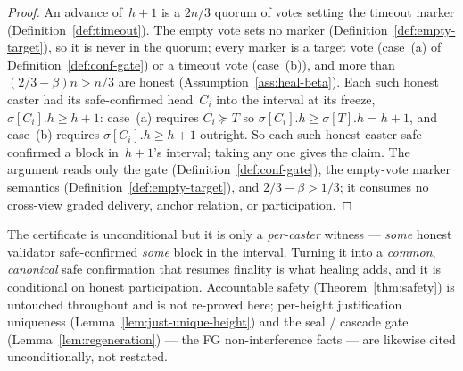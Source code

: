 \ifx\litemode\undefined\documentclass{article}\fi
\theoremstyle{plain}
\theoremstyle{definition}
\theoremstyle{remark}
\begin{document}
\begin{proof}
An advance of~\(h+1\) is a \(2n/3\) quorum of votes setting the timeout marker
(Definition~\ref{def:timeout}).  The empty vote sets no marker
(Definition~\ref{def:empty-target}), so it is never in the quorum; every marker is
a target vote (case~(a) of Definition~\ref{def:conf-gate}) or a timeout vote
(case~(b)), and more than \((2/3-\beta)n > n/3\) are honest
(Assumption~\ref{ass:heal-beta}).  Each such honest caster had its safe-confirmed
head~\(C_i\) into the interval at its freeze, \(\sigma[C_i].h \geq h+1\): case~(a)
requires \(C_i \succeq T\) so \(\sigma[C_i].h \geq \sigma[T].h = h+1\), and case~(b)
requires \(\sigma[C_i].h \geq h+1\) outright.  So each such honest caster
safe-confirmed a block in~\(h+1\)'s interval; taking any one gives the claim.  The
argument reads only the gate (Definition~\ref{def:conf-gate}), the empty-vote
marker semantics (Definition~\ref{def:empty-target}), and \(2/3-\beta>1/3\); it
consumes no cross-view graded delivery, anchor relation, or participation.
\end{proof}

The certificate is unconditional but it is only a \emph{per-caster} witness ---
\emph{some} honest validator safe-confirmed \emph{some} block in the interval.
Turning it into a \emph{common}, \emph{canonical} safe confirmation that resumes
finality is what healing adds, and it is conditional on honest participation.
Accountable safety (Theorem~\ref{thm:safety}) is untouched throughout and is not
re-proved here; per-height justification uniqueness
(Lemma~\ref{lem:just-unique-height}) and the seal / cascade gate
(Lemma~\ref{lem:regeneration}) --- the FG non-interference facts --- are likewise
cited unconditionally, not restated.
\end{document}
